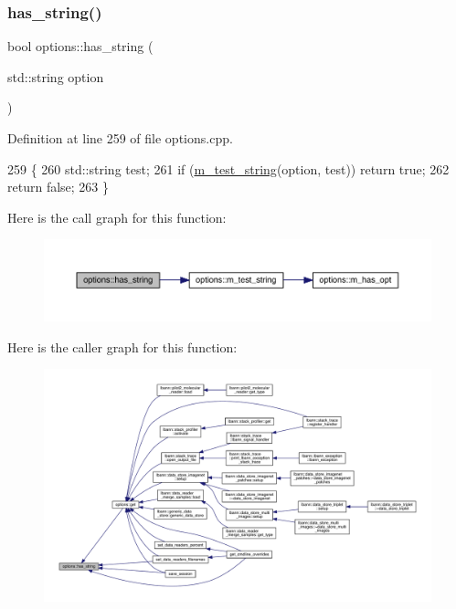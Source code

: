 \subsubsection{\texorpdfstring{has\+\_\+string()}{has\_string()}}
{\footnotesize\ttfamily bool options\+::has\+\_\+string (\begin{DoxyParamCaption}\item[{std\+::string}]{option }\end{DoxyParamCaption})}



Definition at line 259 of file options.\+cpp.


\begin{DoxyCode}
259                                          \{
260   std::string test;
261   \textcolor{keywordflow}{if} (\hyperlink{classoptions_a8286a8617eec86a3d4cf678bd17739ba}{m\_test\_string}(option, test)) \textcolor{keywordflow}{return} \textcolor{keyword}{true};
262   \textcolor{keywordflow}{return} \textcolor{keyword}{false};
263 \}
\end{DoxyCode}
Here is the call graph for this function\+:\nopagebreak
\begin{figure}[H]
\begin{center}
\leavevmode
\includegraphics[width=350pt]{classoptions_a5db5b27267c27ffe1b029948f64e54c1_cgraph}
\end{center}
\end{figure}
Here is the caller graph for this function\+:\nopagebreak
\begin{figure}[H]
\begin{center}
\leavevmode
\includegraphics[width=350pt]{classoptions_a5db5b27267c27ffe1b029948f64e54c1_icgraph}
\end{center}
\end{figure}
\mbox{\label{classoptions_a6d909eacd89dee5f0b153430985f9822}} 

